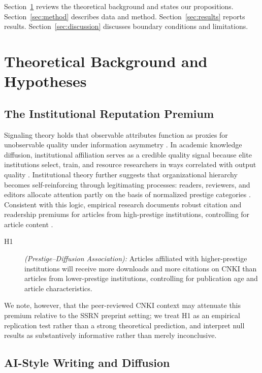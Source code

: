 \documentclass[12pt,a4paper]{article}
\begin{document}
Section~\ref{sec:theory} reviews the theoretical background and states
our propositions.
Section~\ref{sec:method} describes data and method.
Section~\ref{sec:results} reports results.
Section~\ref{sec:discussion} discusses boundary conditions and limitations.

\section{Theoretical Background and Hypotheses}
\label{sec:theory}

\subsection{The Institutional Reputation Premium}

Signaling theory holds that observable attributes function as proxies
for unobservable quality under information asymmetry \citep{Spence1973}.
In academic knowledge diffusion, institutional affiliation serves as a
credible quality signal because elite institutions select, train, and
resource researchers in ways correlated with output quality
\citep{Long1979,Lariviere2010}.
Institutional theory further suggests that organizational hierarchy
becomes self-reinforcing through legitimating processes: readers,
reviewers, and editors allocate attention partly on the basis of
normalized prestige categories \citep{DiMaggio1983}.
Consistent with this logic, empirical research documents robust
citation and readership premiums for articles from high-prestige
institutions, controlling for article content \citep{Wang2013}.
\begin{description}
  \item[H1] \textit{(Prestige--Diffusion Association):}
  Articles affiliated with higher-prestige institutions will receive
  more downloads and more citations on CNKI than articles from
  lower-prestige institutions, controlling for publication age
  and article characteristics.
\end{description}
We note, however, that the peer-reviewed CNKI context may attenuate
this premium relative to the SSRN preprint setting; we treat H1 as an
empirical replication test rather than a strong theoretical prediction,
and interpret null results as substantively informative rather than
merely inconclusive.

\subsection{AI-Style Writing and Diffusion}
\end{document}
